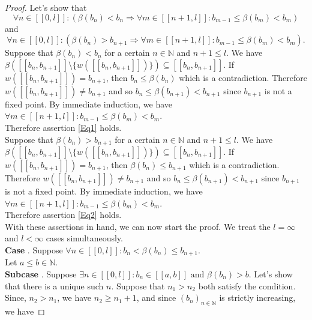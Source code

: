 \documentclass[a4paper,11pt]{article}
\newcommand*\circled[1]{\tikz[baseline=(char.base)]{
            \node[shape=circle,draw,inner sep=2pt] (char) {#1};}}
\theoremstyle{plain}
\theoremstyle{definition}
\theoremstyle{remark}
\begin{document}
\begin{proof}
Let's show that 
\begin{equation}
\label{Eq1}
\boxed{\forall n \in [\![0,l]\!] : \left( \beta(b_n) < b_n \Rightarrow \forall m \in [\![n+1,l]\!] : b_{m-1} \leq \beta(b_m) < b_m \right) }
\end{equation}
and
\begin{equation}
\label{Eq2}
\boxed{\forall n \in [\![0,l]\!] : \left( \beta(b_n) > b_{n+1} \Rightarrow \forall m \in [\![n+1,l]\!] : b_{m-1} \leq \beta(b_m) < b_m \right) }.
\end{equation}
Suppose that $\beta(b_n) < b_n$ for a certain $n \in \mathbb{N}$ and $n+1 \leq l$. We have ${\beta([\![b_n,b_{n+1}]\!] \setminus \{w([\![b_n,b_{n+1}]\!])\}) \subseteq [\![b_n,b_{n+1}]\!]}$. If $w([\![b_n,b_{n+1}]\!]) = b_{n+1}$, then $b_n \leq \beta(b_n)$ which is a contradiction. Therefore $w([\![b_n,b_{n+1}]\!]) \neq b_{n+1}$ and so $b_n \leq \beta(b_{n+1}) < b_{n+1}$ since $b_{n+1}$ is not a fixed point. By immediate induction, we have ${\forall m \in [\![n+1,l]\!] : b_{m-1} \leq \beta(b_m) < b_m}$. \\
Therefore assertion \ref{Eq1} holds. \\
Suppose that $\beta(b_n) > b_{n+1}$ for a certain $n \in \mathbb{N}$ and $n + 1 \leq l$. We have ${\beta([\![b_n,b_{n+1}]\!] \setminus \{w([\![b_n,b_{n+1}]\!])\}) \subseteq [\![b_n,b_{n+1}]\!]}$. If $w([\![b_n,b_{n+1}]\!]) = b_{n+1}$, then ${\beta(b_n) \leq b_{n+1}}$ which is a contradiction. Therefore $w([\![b_n,b_{n+1}]\!]) \neq b_{n+1}$ and so ${b_n \leq \beta(b_{n+1}) < b_{n+1}}$ since $b_{n+1}$ is not a fixed point. By immediate induction, we have ${\forall m \in [\![n+1,l]\!] : b_{m-1} \leq \beta(b_m) < b_m}$. \\
Therefore assertion \ref{Eq2} holds. \\
With these assertions in hand, we can now start the proof. We treat the $l = \infty$ and $l < \infty$ cases simultaneously. \\
\textbf{Case \circled{1}}. Suppose $\forall n \in [\![0,l]\!] : b_n < \beta(b_n) \leq b_{n+1}$. \\
Let $a \leq b \in \mathbb{N}$. \\
\textbf{Subcase \circled{1.1}}. Suppose $\exists n \in [\![0,l]\!] : b_n \in [\![a,b]\!] \text{ and } \beta(b_n) > b$. Let's show that there is a unique such $n$. Suppose that $n_1 > n_2$ both satisfy the condition. Since, $n_2 > n_1$, we have $n_2 \geq n_1 + 1$, and since $(b_n)_{n \in \mathbb{N}}$ is strictly increasing, we have 

\end{proof}
\end{document}
